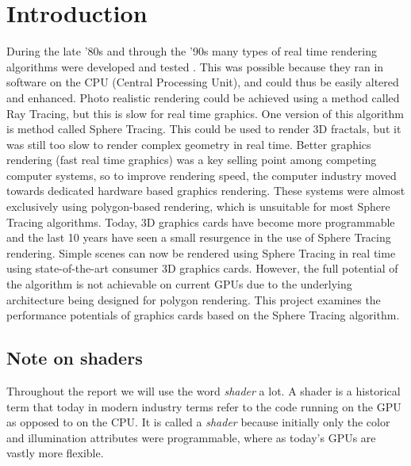 \chapter{Introduction} 	

	During the late '80s and through the '90s many types of real time rendering
	algorithms were developed and tested \cite{Hart1989}. This was possible
	because they ran in software on the	CPU (Central Processing Unit), and
	could thus be easily altered and enhanced. Photo realistic rendering could
	be achieved using a method called Ray Tracing, but this is slow for real time
	graphics\cite{PeterShirleyMichaelAshikhmin2005}. One version of this algorithm is method called Sphere Tracing. This could be used to render 3D
	fractals\cite{Hart1989}, but it was	still too slow to render complex
	geometry in real time\cite{Hart1989}. Better graphics rendering (fast real
	time graphics) was a key selling point among competing computer systems, so
	to improve rendering speed, the computer industry moved towards dedicated
	hardware based graphics rendering\cite{Houston2010}. These systems were
	almost exclusively using polygon-based	rendering, which is unsuitable for most
	Sphere Tracing algorithms. Today, 3D graphics cards have become more
	programmable and the last 10 years have seen a small resurgence in the use
	of Sphere Tracing rendering\cite{InigoQuilez}. Simple scenes can now be
	rendered using Sphere Tracing in real time using state-of-the-art consumer
	3D graphics cards. However, the full potential of the algorithm is not
	achievable on current GPUs due to the underlying architecture being
	designed for polygon rendering\cite{Houston2010}. This project examines the
	performance	potentials of graphics cards based on the Sphere Tracing 
	algorithm.

	\section{Note on shaders} 
		
		Throughout the report we will use the word \emph{shader} a lot. A
		shader is a historical term that today in modern industry terms refer to
		the code running on the GPU as opposed to on the CPU. It is called a
		\emph{shader} because initially only the color and illumination 
		attributes were	programmable, where as today's GPUs are vastly more 
		flexible. 

